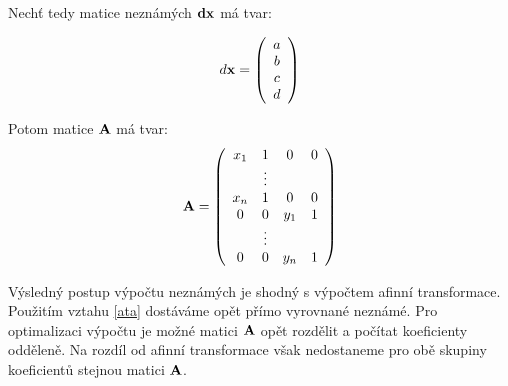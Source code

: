 Nechť tedy matice neznámých ${\bf dx}$ má tvar: 

$$ d{\bf x} =
\left(
\begin{array}{c}
a\\
b\\
c\\
d
\end{array}
\right) $$

Potom matice ${\bf A}$ má tvar:
$$ 
{\bf A}=
\left(
\begin{array}{cccc}
x_{1} & 1 & 0 & 0\\
& \vdots  &  & \\
x_{n} & 1 & 0 & 0\\
0     &  0 & y_{1} & 1\\
& \vdots  &  & \\
0 &  0 & y_{n} & 1\\
\end{array}
\right)
$$

Výsledný postup výpočtu neznámých je shodný s výpočtem afinní transformace. 
Použitím vztahu \ref{ata} dostáváme opět přímo vyrovnané
neznámé. Pro optimalizaci výpočtu je možné matici ${\bf A}$ opět rozdělit a
počítat koeficienty odděleně. Na rozdíl od afinní transformace však
nedostaneme pro obě skupiny koeficientů stejnou matici ${\bf A}$.
